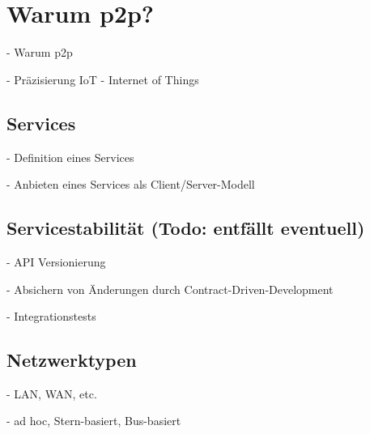 \section{Warum p2p?}		
    - Warum p2p

    - Präzisierung IoT - Internet of Things
    \subsection{Services}
    - Definition eines Services
    
    
    - Anbieten eines Services als Client/Server-Modell
    
    \subsection{Servicestabilität (Todo: entfällt eventuell)}
    - API Versionierung
    
    - Absichern von Änderungen durch Contract-Driven-Development
    
    - Integrationstests
    \subsection{Netzwerktypen}
		- LAN, WAN, etc.
		
		- ad hoc, Stern-basiert, Bus-basiert
